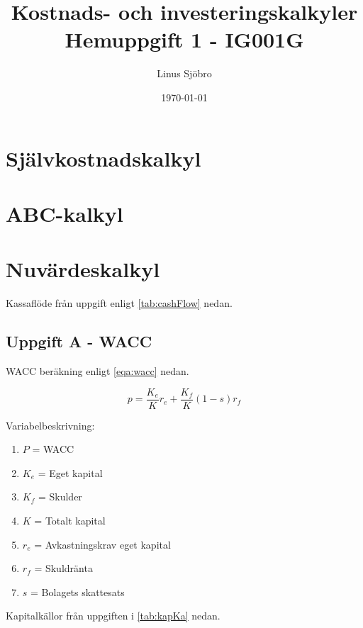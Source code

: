 \documentclass[12pt]{article}
\title{Kostnads- och investeringskalkyler \\ \large{Hemuppgift 1 - IG001G}}
\author{Linus Sjöbro}
\date{\today}
\begin{document}
\maketitle
\section{Självkostnadskalkyl}

\section{ABC-kalkyl}

\section{Nuvärdeskalkyl}
Kassaflöde från uppgift enligt \cref{tab:cashFlow} nedan.


\subsection{Uppgift A - WACC}
WACC beräkning enligt \cref{eqa:wacc} nedan.

\begin{equation} \label{eqa:wacc}
p=\frac{K_e}{K}r_e + \frac{K_f}{K}(1-s)r_f
\end{equation}

\bigskip

Variabelbeskrivning:
\begin{enumerate}
    \item $P$ = WACC
    \item $K_e$ = Eget kapital
    \item $K_f$ = Skulder
    \item $K$ = Totalt kapital
    \item $r_e$ = Avkastningskrav eget kapital
    \item $r_f$ = Skuldränta
    \item $s$ = Bolagets skattesats
\end{enumerate}

Kapitalkällor från uppgiften i \cref{tab:kapKa} nedan.
\end{document}

